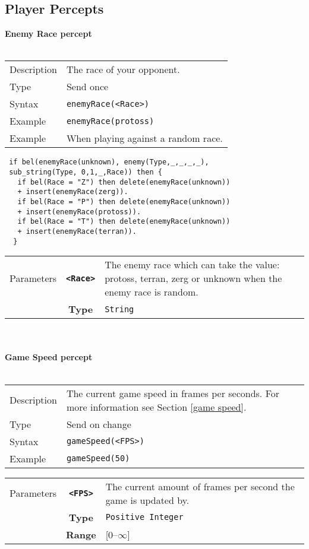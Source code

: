\subsection{Player Percepts}
\textbf{Enemy Race percept}\\
\\
\begin{tabularx}{\textwidth}{lX}
 Description & The race of your opponent. \\
 Type & Send once \\
 Syntax &  \verb|enemyRace(<Race>)| \\
 Example & \verb|enemyRace(protoss)|   \\
 Example & When playing against a random race.
 \end{tabularx}
 \begin{lstlisting}
 if bel(enemyRace(unknown), enemy(Type,_,_,_,_),
 sub_string(Type, 0,1,_,Race)) then {
   if bel(Race = "Z") then delete(enemyRace(unknown))
   + insert(enemyRace(zerg)).
   if bel(Race = "P") then delete(enemyRace(unknown))
   + insert(enemyRace(protoss)).
   if bel(Race = "T") then delete(enemyRace(unknown))
   + insert(enemyRace(terran)).
  }
 \end{lstlisting}
 \begin{tabularx}{\textwidth}{l | c | p{8cm}|}
 \cline{2-3}
  Parameters & \textbf{\verb|<Race>|} & The enemy race which can take the value: protoss, terran, zerg or unknown                 when the enemy race is random. \\
             & \textbf{Type} & \verb|String| \\
            \cline{2-3}
\end{tabularx}
\\\\
\noindent
\textbf{Game Speed percept}\\
\\
\begin{tabularx}{\textwidth}{lX}
 Description & The current game speed in frames per seconds. For more information see Section \ref{game speed}. \\
 Type & Send on change \\
 Syntax &  \verb|gameSpeed(<FPS>)| \\
 Example & \verb|gameSpeed(50)|   \\
 \end{tabularx}
 \begin{tabularx}{\textwidth}{l | c | p{8cm}|}
 \cline{2-3}
  Parameters & \textbf{\verb|<FPS>|} & The current amount of frames per second the game is updated by. \\
             & \textbf{Type} & \verb|Positive Integer| \\
             & \textbf{Range} & [0--$\infty$] \\
            \cline{2-3}
\end{tabularx}
